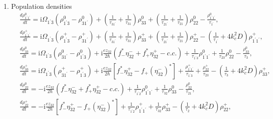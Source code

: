 \documentclass[10pt,letterpaper]{article}%
\begin{document}
\begin{enumerate}
	\item { Population densities%
		\begin{subequations}
			\label{eq:diagonaldm}%
			\begin{align}
			&  \frac{d\rho_{1^{\prime}1^{\prime}}^{0}}{dt}=\mathrm{i}\Omega_{1^{\prime}%
				3}\left(  \rho_{1^{\prime}3}^{0}-\rho_{31^{\prime}}^{0}\right)  +\left(
			\frac{1}{\tau_{31^{\prime}}}+\frac{1}{\tau_{31}}\right)  \rho_{33}^{0}+\left(
			\frac{1}{\tau_{21^{\prime}}}+\frac{1}{\tau_{21}}\right)  \rho_{22}^{0}%
			-\frac{\rho_{1^{\prime}1^{\prime}}^{0}}{\tau_{1^{\prime}}},\label{eq:rho11-dm}%
			\\
			&  \frac{d\rho_{1^{\prime}1^{\prime}}^{+}}{dt}=\mathrm{i}\Omega_{1^{\prime}%
				3}\left(  \rho_{1^{\prime}3}^{+}-\rho_{31^{\prime}}^{+}\right)  +\left(
			\frac{1}{\tau_{31^{\prime}}}+\frac{1}{\tau_{31}}\right)  \rho_{33}^{+}+\left(
			\frac{1}{\tau_{21^{\prime}}}+\frac{1}{\tau_{21}}\right)  \rho_{22}^{+}-\left(
			\frac{1}{\tau_{1^{\prime}}}+4k_{c}^{2}D\right)  \rho_{1^{\prime}1^{\prime}%
			}^{+},\label{eq:rtpop1grating}\\
			&  \frac{d\rho_{33}^{0}}{dt}=\mathrm{i}\Omega_{1^{\prime}3}\left(
			\rho_{31^{\prime}}^{0}-\rho_{1^{\prime}3}^{0}\right)  +\mathrm{i}\frac
			{ez_{32}}{2\hbar}\left(  f_{-}^{\ast}\eta_{32}^{-}+f_{+}^{\ast}\eta_{32}%
			^{+}-c.c.\right)  +\frac{1}{\tau_{1^{\prime}3}}\rho_{1^{\prime}1^{\prime}}%
			^{0}+\frac{1}{\tau_{23}}\rho_{22}^{0}-\frac{\rho_{33}^{0}}{\tau_{3}},\\
			&  \frac{d\rho_{33}^{+}}{dt}=\mathrm{i}\Omega_{1^{\prime}3}\left(
			\rho_{31^{\prime}}^{+}-\rho_{1^{\prime}3}^{+}\right)  +\mathrm{i}\frac
			{ez_{32}}{2\hbar}\left[  f_{-}^{\ast}\eta_{32}^{+}-f_{+}(\eta_{32}^{-})^{\ast
			}\right]  +\frac{\rho_{1^{\prime}1^{\prime}}^{+}}{\tau_{1^{\prime}3}}%
			+\frac{\rho_{22}^{+}}{\tau_{23}}-\left(  \frac{1}{\tau_{3}}+4k_{c}%
			^{2}D\right)  \rho_{33}^{+},\label{eq:rtpop3grating}\\
			&  \frac{d\rho_{22}^{0}}{dt}=-\mathrm{i}\frac{ez_{32}}{2\hbar}\left(
			f_{-}^{\ast}\eta_{32}^{-}+f_{+}^{\ast}\eta_{32}^{+}-c.c.\right)  +\frac
			{1}{\tau_{1^{\prime}2}}\rho_{1^{\prime}1^{\prime}}^{0}+\frac{1}{\tau_{32}}%
			\rho_{33}^{0}-\frac{\rho_{22}^{0}}{\tau_{21}},\\
			&  \frac{d\rho_{22}^{+}}{dt}=-\mathrm{i}\frac{ez_{32}}{2\hbar}\left[
			f_{-}^{\ast}\eta_{32}^{+}-f_{+}(\eta_{32}^{-})^{\ast}\right]  +\frac{1}%
			{\tau_{1^{\prime}2}}\rho_{1^{\prime}1^{\prime}}^{+}+\frac{1}{\tau_{32}}%
			\rho_{33}^{+}-\left(  \frac{1}{\tau_{2}}+4k_{c}^{2}D\right)  \rho_{22}^{+},
			\label{eq:rtpop2grating}%
			\end{align}%
		\end{subequations}%
	}
	

\end{enumerate}
\end{document}
